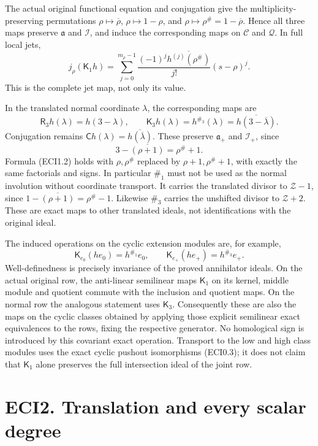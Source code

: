The actual original functional equation and conjugation give the
multiplicity-preserving permutations \(\rho\mapsto\overline\rho\),
\(\rho\mapsto1-\rho\), and \(\rho\mapsto\rho^\#=1-\overline\rho\). Hence
all three maps preserve \(\mathfrak a\) and \(\mathcal I\), and induce
the corresponding maps on \(\mathscr C\) and \(\mathcal Q\). In full
local jets, \[
j_\rho(\mathsf K_1h)=
\sum_{j=0}^{m_\rho-1}
\frac{(-1)^j\overline{h^{(j)}(\rho^\#)}}{j!}(s-\rho)^j.
\tag{ECI1.2}
\] This is the complete jet map, not only its value.

In the translated normal coordinate \(\lambda\), the corresponding maps
are \[
\mathsf R_3h(\lambda)=h(3-\lambda),\qquad
\mathsf K_3h(\lambda)=h^{\#_3}(\lambda)=
\overline{h(3-\overline\lambda)}.
\tag{ECI1.3}
\] Conjugation remains
\(\mathsf C h(\lambda)=\overline{h(\overline\lambda)}\). These preserve
\(\mathfrak a_+\) and \(\mathcal I_+\), since \[
3-\overline{(\rho+1)}=\rho^\#+1.
\tag{ECI1.4}
\] Formula (ECI1.2) holds with \(\rho,\rho^\#\) replaced by
\(\rho+1,\rho^\#+1\), with exactly the same factorials and signs. In
particular \(\#_1\) must not be used as the normal involution without
coordinate transport. It carries the translated divisor to
\(\mathscr Z-1\), since \(1-\overline{(\rho+1)}=\rho^\#-1\). Likewise
\(\#_3\) carries the unshifted divisor to \(\mathscr Z+2\). These are
exact maps to other translated ideals, not identifications with the
original ideal.

The induced operations on the cyclic extension modules are, for example,
\[
\mathsf K_{e_0}(h e_0)=h^{\#_1}e_0,
\qquad
\mathsf K_{e_+}(h e_+)=h^{\#_3}e_+.
\tag{ECI1.5}
\] Well-definedness is precisely invariance of the proved annihilator
ideals. On the actual original row, the anti-linear semilinear maps
\(\mathsf K_1\) on its kernel, middle module and quotient commute with
the inclusion and quotient maps. On the normal row the analogous
statement uses \(\mathsf K_3\). Consequently these are also the maps on
the cyclic classes obtained by applying those explicit semilinear exact
equivalences to the rows, fixing the respective generator. No
homological sign is introduced by this covariant exact operation.
Transport to the low and high class modules uses the exact cyclic
pushout isomorphisms (ECI0.3); it does not claim that \(\mathsf K_1\)
alone preserves the full intersection ideal of the joint row.

\section{ECI2. Translation and every scalar
degree}\label{eci2.-translation-and-every-scalar-degree}

